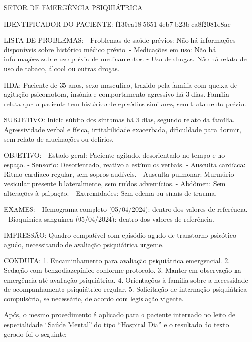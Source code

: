 \begin{spverbatim}
SETOR DE EMERGÊNCIA PSIQUIÁTRICA

IDENTIFICADOR DO PACIENTE: f130ea18-5651-4eb7-b23b-ca8f2081d8ac

LISTA DE PROBLEMAS:
- Problemas de saúde prévios: Não há informações disponíveis sobre histórico 
médico prévio.
- Medicações em uso: Não há informações sobre uso prévio de medicamentos.
- Uso de drogas: Não há relato de uso de tabaco, álcool ou outras drogas.

HDA:
Paciente de 35 anos, sexo masculino, trazido pela família com queixa de 
agitação psicomotora, insônia e comportamento agressivo há 3 dias. Família 
relata que o paciente tem histórico de episódios similares, sem tratamento 
prévio.

SUBJETIVO:
Início súbito dos sintomas há 3 dias, segundo relato da família. 
Agressividade verbal e física, irritabilidade exacerbada, dificuldade para 
dormir, sem relato de alucinações ou delírios.

OBJETIVO:
- Estado geral: Paciente agitado, desorientado no tempo e no espaço.
- Sensório: Desorientado, reativo a estímulos verbais.
- Ausculta cardíaca: Ritmo cardíaco regular, sem sopros audíveis.
- Ausculta pulmonar: Murmúrio vesicular presente bilateralmente, sem ruídos 
adventícios.
- Abdômen: Sem alterações à palpação.
- Extremidades: Sem edema ou sinais de trauma.

EXAMES:
- Hemograma completo (05/04/2024): dentro dos valores de referência.
- Bioquímica sanguínea (05/04/2024): dentro dos valores de referência.

IMPRESSÃO:
Quadro compatível com episódio agudo de transtorno psicótico agudo, 
necessitando de avaliação psiquiátrica urgente.

CONDUTA:
1. Encaminhamento para avaliação psiquiátrica emergencial.
2. Sedação com benzodiazepínico conforme protocolo.
3. Manter em observação na emergência até avaliação psiquiátrica.
4. Orientações à família sobre a necessidade de acompanhamento psiquiátrico 
regular.
5. Solicitação de internação psiquiátrica compulsória, se necessário, de 
acordo com legislação vigente.
\end{spverbatim}

Após, o mesmo procedimento é aplicado para o paciente internado no leito de especialidade ``Saúde Mental'' do tipo ``Hospital Dia'' e o resultado do texto gerado foi o seguinte:

